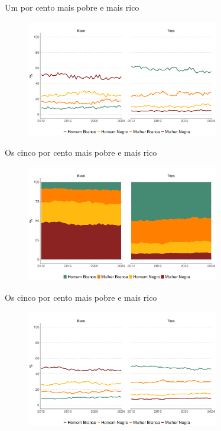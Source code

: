 \documentclass[10pt, xcolor=x11names,compress]{beamer}
\begin{document}
		\begin{frame}{Um por cento mais pobre e mais rico}
		\begin{figure}
			\centering
			\includegraphics[width = 0.75\textwidth]{figures_output/base_topo_1_linha.pdf}
		\end{figure}
	\end{frame}
	
		\begin{frame}{Os cinco por cento mais pobre e mais rico}
		\begin{figure}
			\centering
			\includegraphics[width = 0.75\textwidth]{figures_output/base_topo_5.pdf}
		\end{figure}
	\end{frame}
	
			\begin{frame}{Os cinco por cento mais pobre e mais rico}
		\begin{figure}
			\centering
			\includegraphics[width = 0.75\textwidth]{figures_output/base_topo_5_linha.pdf}
		\end{figure}
	\end{frame}
	
\end{document}
